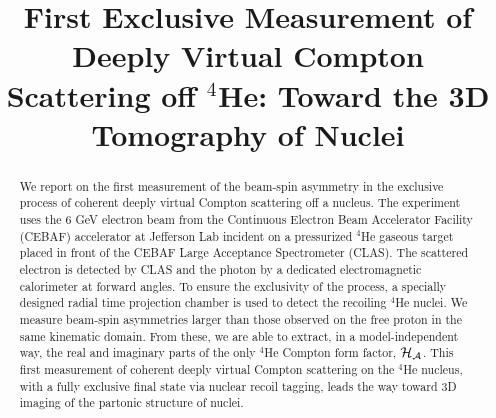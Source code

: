 \documentclass[twocolumn,nofootinbib,prl,superscriptaddress,secnumarabic,amssymb,nobibnotes,aps,floatfix]{revtex4}
\begin{document}
\title{First Exclusive Measurement of Deeply Virtual Compton Scattering off $^4$He: Toward the 3D Tomography of Nuclei}


%

\begin{abstract}
We report on the first measurement of the beam-spin asymmetry in the exclusive 
process of coherent deeply virtual Compton scattering off a nucleus. The 
experiment uses the 6 GeV electron beam from the Continuous Electron Beam 
Accelerator Facility (CEBAF) accelerator at Jefferson Lab incident on a 
pressurized $^4$He gaseous target placed in front of the CEBAF Large Acceptance 
Spectrometer (CLAS). The scattered electron is detected by CLAS and the photon 
by a dedicated electromagnetic calorimeter at forward angles. To ensure the 
exclusivity of the process, a specially designed radial time projection chamber 
is used to detect the recoiling $^4$He nuclei.  We measure beam-spin 
asymmetries larger than those observed on the free proton in the same kinematic 
domain.  From these, we are able to extract, in a model-independent way, the 
real and imaginary parts of the only $^4$He Compton form factor, $\cal H_A$.  
This first measurement of coherent deeply virtual Compton scattering on the 
$^4$He nucleus, with a fully exclusive final state via nuclear recoil tagging, 
leads the way toward 3D imaging of the partonic structure of nuclei.
\end{abstract}

\maketitle 
\end{document}
